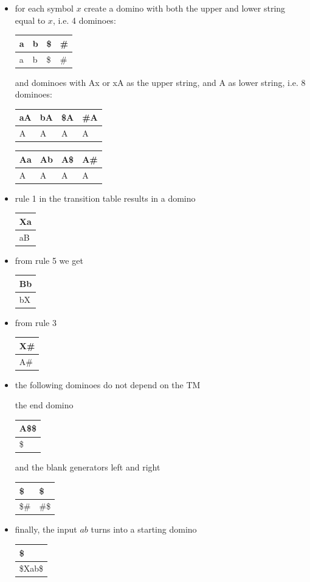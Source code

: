 \begin{itemize}
\item for each symbol $x$ create a domino with both the upper and lower string
  equal to $x$, i.e. 4 dominoes:
\begin{tabular}{|l||l||l||l|}
\hline
a & b & \$ & \# \\ \hline
a & b & \$ & \# \\
\hline
\end{tabular}
and dominoes with Ax or xA as the upper string, and A as lower
string, i.e. 8 dominoes:
\begin{tabular}{|l||l||l||l|}
\hline
aA & bA & \$A & \#A \\ \hline
A & A & A & A \\
\hline
\end{tabular}
\begin{tabular}{|l||l||l||l|}
\hline
Aa & Ab & A\$ & A\# \\ \hline
A & A & A & A \\
\hline
\end{tabular}

\item rule 1 in the transition table results in a domino
\begin{tabular}{|l|}
\hline
Xa \\ \hline
aB \\
\hline
\end{tabular}

\item from rule 5 we get
\begin{tabular}{|l|}
\hline
Bb \\ \hline
bX \\
\hline
\end{tabular}

\item
from rule 3
\begin{tabular}{|l|}
\hline
X\# \\ \hline
A\# \\
\hline
\end{tabular}


\item
the following dominoes do not depend on the TM

the end domino
\begin{tabular}{|l|}
\hline
A\$\$                     \\ \hline
   \$                     \\ 
\hline
\end{tabular}
and the blank generators left and right
\begin{tabular}{|l||l|}
\hline
        \$   & \$         \\ \hline
        \$\# & \#\$       \\ 
\hline
\end{tabular}

\item
finally, the input $ab$ turns into a starting domino
\begin{tabular}{|l|}
\hline
\$ \\ \hline
\$Xab\$ \\ 
\hline
\end{tabular}
\end{itemize}

